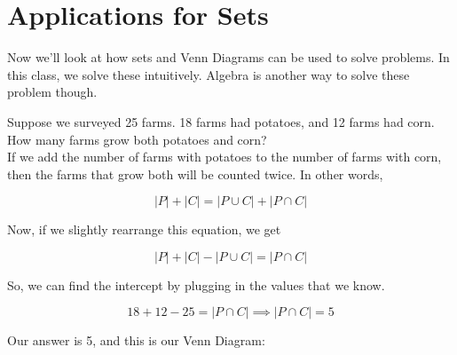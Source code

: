 \section{Applications for Sets}

Now we'll look at how sets and Venn Diagrams can be used to solve problems. In this class, we solve these intuitively. Algebra is another way to solve these problem though.

\begin{boxexample}{}{}
	Suppose we surveyed 25 farms. 18 farms had potatoes, and 12 farms had corn. How many farms grow both potatoes and corn?\\

	If we add the number of farms with potatoes to the number of farms with corn, then the farms that grow both will be counted twice. In other words,

	\[
		|P|+|C|=|P \cup C| + |P \cap C|
	\]

	Now, if we slightly rearrange this equation, we get

	\[
		|P|+|C| - |P \cup C|=|P \cap C|
	\]

	So, we can find the intercept by plugging in the values that we know.

	\[
		18+12-25=|P \cap C| \implies |P \cap C|=5
	\]

	Our answer is 5, and this is our Venn Diagram:

	\begin{venndiagram2sets}[shade=skyblue,showframe=false,labelA={P},labelB={C},labelOnlyA={13},labelOnlyB={7},labelAB={5}]
		\fillACapB
	\end{venndiagram2sets}

\end{boxexample}

